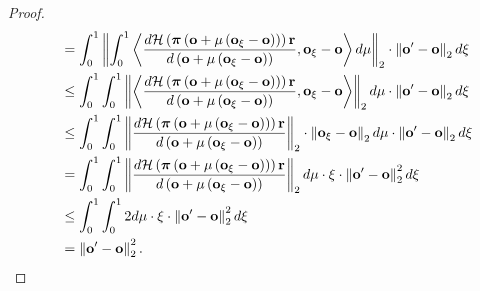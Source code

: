 \documentclass[10pt]{article}
\def\rvo{{\mathbf{o}}}
\def\rvr{{\mathbf{r}}}
\def\rvo{{\mathbf{o}}}
\def\rvpi{{\boldsymbol{\pi}}}
\def\gH{{\mathcal{H}}}
\begin{document}
\begin{proof}
\begin{equation*}
\begin{split}
    &\quad = \int_0^1{ \left\| \int_0^1{\left\langle \frac{d \gH \left( \rvpi\left( \rvo + \mu\left( \rvo_{\xi} - \rvo \right) \right) \right) \rvr }{d \left( \rvo + \mu\left( \rvo_{\xi} - \rvo \right) \right)}, \rvo_{\xi} - \rvo \right\rangle d\mu} \right\|_2 \cdot \left\| \rvo^\prime - \rvo \right\|_2 d\xi} \\
    &\quad \le \int_0^1{  \int_0^1{ \left\| \left\langle \frac{d \gH \left( \rvpi\left( \rvo + \mu\left( \rvo_{\xi} - \rvo \right) \right) \right) \rvr }{d \left( \rvo + \mu\left( \rvo_{\xi} - \rvo \right) \right)}, \rvo_{\xi} - \rvo \right\rangle \right\|_2 d\mu} \cdot \left\| \rvo^\prime - \rvo \right\|_2 d\xi} \\
    &\quad \le \int_0^1{  \int_0^1{ \left\| \frac{d \gH \left( \rvpi\left( \rvo + \mu\left( \rvo_{\xi} - \rvo \right) \right) \right) \rvr }{d \left( \rvo + \mu\left( \rvo_{\xi} - \rvo \right) \right)} \right\|_2 \cdot \left\| \rvo_{\xi} - \rvo \right\|_2 d\mu} \cdot \left\| \rvo^\prime - \rvo \right\|_2 d\xi} \\
    &\quad = \int_0^1{  \int_0^1{ \left\| \frac{d \gH \left( \rvpi\left( \rvo + \mu\left( \rvo_{\xi} - \rvo \right) \right) \right) \rvr }{d \left( \rvo + \mu\left( \rvo_{\xi} - \rvo \right) \right)} \right\|_2 d\mu} \cdot \xi \cdot \left\| \rvo^\prime - \rvo \right\|_2^2 d\xi} \\
    &\quad \le \int_0^1{  \int_0^1{ 2 d\mu} \cdot \xi \cdot \left\| \rvo^\prime - \rvo \right\|_2^2 d\xi} \\
    &\quad = \left\| \rvo^\prime - \rvo \right\|_2^2. \qedhere
\end{split}
\end{equation*}
\end{proof}
\end{document}
